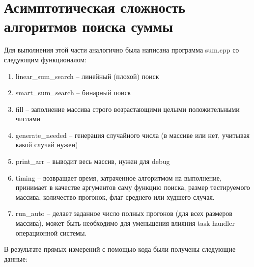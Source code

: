 \documentclass[a4paper,12pt]{report}
\begin{document}
    \section*{Асимптотическая сложность алгоритмов поиска суммы}
    Для выполнения этой части аналогично была написана программа sum.cpp со следующим функционалом:
    \begin{enumerate}
        \item linear\_sum\_search -- линейный (плохой) поиск
        \item smart\_sum\_search -- бинарный поиск
        \item fill -- заполнение массива строго возрастающими целыми положительными числами
        \item generate\_needed -- генерация случайного числа (в массиве или нет, учитывая какой случай нужен)
        \item print\_arr -- выводит весь массив, нужен для debug
        \item timing -- возвращает время, затраченное алгоритмом на выполнение, принимает в качестве аргументов саму функцию поиска, размер тестируемого массива, количество прогонок, флаг среднего или худшего случая.
        \item run\_auto -- делает заданное число полных прогонов (для всех размеров массива), может быть необходимо для уменьшения влияния task handler операционной системы. 
    \end{enumerate}
    В результате прямых измерений с помощью кода были получены следующие данные:
\end{document}

